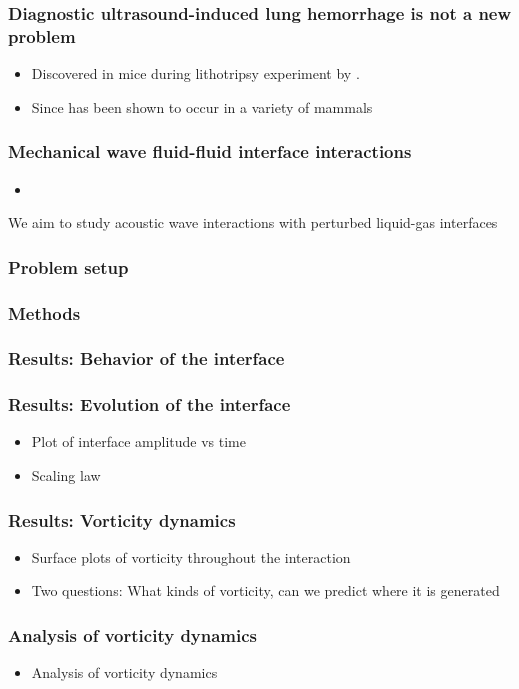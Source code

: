 \begin{frame} \frametitle{Diagnostic ultrasound-induced lung hemorrhage is not a new problem}
  \begin{itemize}
  \item Discovered in mice during lithotripsy experiment by \cite{Child1990}.
  \item Since has been shown to occur in a variety of mammals 
  \end{itemize}
\end{frame}
\begin{frame} \frametitle{Mechanical wave fluid-fluid interface interactions}
  \begin{itemize}
  \item 
  \end{itemize}
\end{frame}
\begin{frame}
We aim to study acoustic wave interactions with perturbed liquid-gas interfaces
\end{frame}
\begin{frame} \frametitle{Problem setup}
\end{frame}
\begin{frame} \frametitle{Methods}
\end{frame}
\begin{frame} \frametitle{Results: Behavior of the interface}
\end{frame}
\begin{frame} \frametitle{Results: Evolution of the interface}
  \begin{itemize}
  \item Plot of interface amplitude vs time
  \item Scaling law
  \end{itemize}
\end{frame}
\begin{frame} \frametitle{Results: Vorticity dynamics}
  \begin{itemize}
  \item Surface plots of vorticity throughout the interaction
  \item Two questions: What kinds of vorticity, can we predict where it is generated
  \end{itemize}
\end{frame}
\begin{frame} \frametitle{Analysis of vorticity dynamics}%
  \begin{itemize}%
  \item Analysis of vorticity dynamics
  \end{itemize}
\end{frame}
